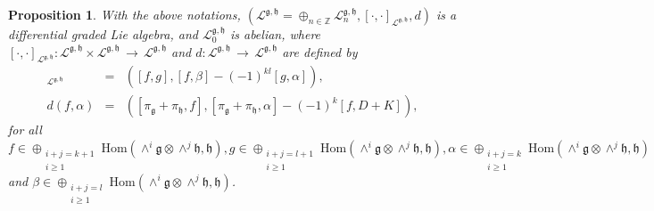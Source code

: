 \documentclass[12pt]{amsart}
\newtheorem{pro}[thm]{Proposition}
\newcommand{\lon }{\,\rightarrow\,}
\newcommand{\g}{\mathfrak g}
\newcommand{\h}{\mathfrak h}
\newcommand{\huaL}{\mathcal{L}}
\newcommand{\Hom}{\mathrm{Hom}}
\begin{document}
\begin{pro}
With the above notations, $(\huaL^{\g, \h}=\oplus_{n\in\mathbb{Z}}\huaL^{\g, \h}_n, [\cdot, \cdot]_{\huaL^{\g, \h}}, d)$ is a differential graded Lie algebra, and $\huaL^{\g, \h}_0$ is abelian, where $[\cdot, \cdot]_{\huaL^{\g, \h}}: \huaL^{\g, \h}\times\huaL^{\g, \h}\lon\huaL^{\g, \h}$ and $d:\huaL^{\g, \h}\lon\huaL^{\g, \h}$ are defined by
\begin{eqnarray*}
[(f, \alpha), (g, \beta)]_{\huaL^{\g, \h}}&=&([f, g], [f, \beta]-(-1)^{kl}[g, \alpha]),\\
d(f, \alpha)&=&([\pi_\g+\pi_\h, f], [\pi_\g+\pi_\h, \alpha]-(-1)^{k}[f, D+K]),
\end{eqnarray*}
for all $f\in\oplus_{\substack{i+j=k+1\\i\geq 1}}\Hom(\wedge^{i}\g\otimes\wedge^{j}\h, \h), g\in\oplus_{\substack{i+j=l+1\\i\geq 1}}\Hom(\wedge^{i}\g\otimes\wedge^{j}\h, \h), \alpha\in\oplus_{\substack{i+j=k\\i\geq 1}}\Hom(\wedge^{i}\g\otimes\wedge^{j}\h, \h)$ and $\beta\in\oplus_{\substack{i+j=l\\i\geq 1}}\Hom(\wedge^{i}\g\otimes\wedge^{j}\h, \h)$.
\end{pro}
\end{document}
